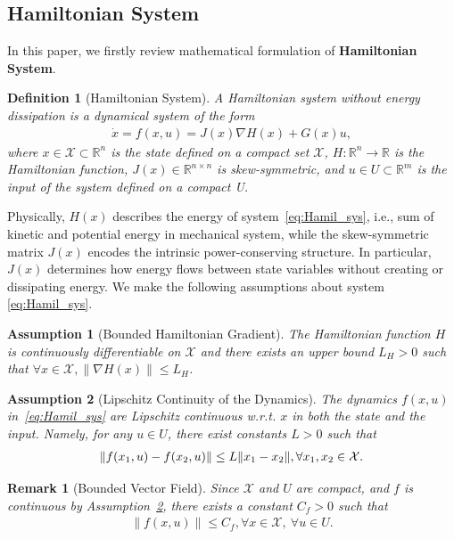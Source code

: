 \documentclass[letterpaper, 10 pt, conference]{ieeeconf}
\newtheorem{assumption}{Assumption}
\newtheorem{definition}{Definition}
\newtheorem{remark}{Remark}
\newcommand{\X}{\mathcal{X}}
\newcommand{\R}{\mathbb{R}}
\begin{document}
\subsection{Hamiltonian System}
In this paper, we firstly review mathematical formulation of \textbf{Hamiltonian System}.

\begin{definition}[Hamiltonian System]
A Hamiltonian system without energy dissipation is a dynamical system of the form
\begin{align}
\label{eq:Hamil_sys}
    \dot{x} = f(x,u) = J(x)\nabla H(x) + G(x)u,
\end{align}
where $x \in \X \subset \R^n$ is the state defined on a compact set $\X$, $H:\R^n \to \R$ is the Hamiltonian function, $J(x)\in\R^{n\times n}$ is skew-symmetric, and $u\in U\subset \R^m$ is the input of the system defined on a compact U.
\end{definition}

Physically, $H(x)$ describes the energy of system~\eqref{eq:Hamil_sys}, i.e., sum of kinetic and potential energy in mechanical system, while the skew-symmetric matrix $J(x)$ encodes the intrinsic power-conserving structure. In particular, $J(x)$ determines how energy flows between state variables without creating or dissipating energy. 
We make the following assumptions about system \eqref{eq:Hamil_sys}.

\begin{assumption}[Bounded Hamiltonian Gradient]
\label{ass:bounded_gradient}
The Hamiltonian function $H$ is continuously differentiable on $\X$ and there exists an upper bound $L_H > 0$ such that $\forall x\in\X, \|\nabla H(x)\|\le L_H$.
\end{assumption}

\begin{assumption}[Lipschitz Continuity of the Dynamics]
\label{ass:lipschitz_dynamics}
The dynamics $f(x,u)$ in~\eqref{eq:Hamil_sys} are Lipschitz continuous w.r.t. $x$ in both the state and the input. Namely, for any $u \in U$, there exist constants $L>0$ such that
\begin{align*}
     \|f(x_1,u)-f(x_2,u)\|
    \le
    L\|x_1-x_2\|, \notag \forall x_1,x_2\in\X.
\end{align*}
\end{assumption}

\begin{remark}[Bounded Vector Field]
Since $\X$ and $U$ are compact, and $f$ is continuous by Assumption~\ref{ass:lipschitz_dynamics}, there exists a constant $C_f>0$ such that
\begin{align}
\label{rem:bounded_vector_field}
\|f(x,u)\|\le C_f, \forall x\in\X,\ \forall u\in U.
\end{align}
\end{remark}
\end{document}
